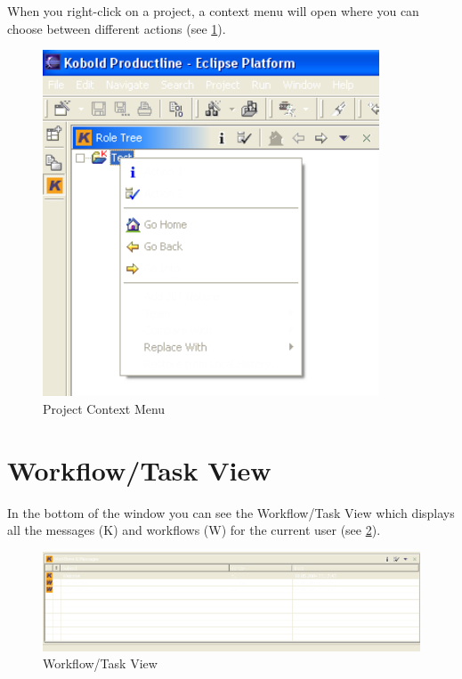 When you right-click on a project, a context menu will open where you can choose 
between different actions (see \ref{rolekontext}).

\begin{figure}[h!]
\begin{center}
\includegraphics[width=10cm]{rolekontext.png}
   \caption{Project Context Menu}
\label{rolekontext}
\end{center}
\end{figure}\par

\section{Workflow/Task View}

In the bottom of the window you can see the Workflow/Task View which displays all 
the messages (K) and workflows (W) for the current user (see \ref{workflow}). 

\begin{figure}[h!]
\begin{center}
\includegraphics[width=15cm]{workflow.png}
   \caption{Workflow/Task View}
\label{workflow}
\end{center}
\end{figure}\par

